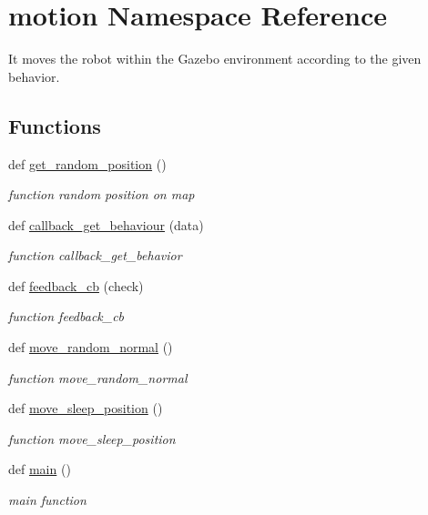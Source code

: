 \hypertarget{namespacemotion}{}\section{motion Namespace Reference}
\label{namespacemotion}


It moves the robot within the Gazebo environment according to the given behavior.  


\subsection*{Functions}
\begin{DoxyCompactItemize}
\item 
def \hyperlink{namespacemotion_af838e21dbf42903e9919b1b9263e306c}{get\+\_\+random\+\_\+position} ()
\begin{DoxyCompactList}\small\item\em function random position on map \end{DoxyCompactList}\item 
def \hyperlink{namespacemotion_a223e65905edcd5f4605198efb23d2ca3}{callback\+\_\+get\+\_\+behaviour} (data)
\begin{DoxyCompactList}\small\item\em function callback\+\_\+get\+\_\+behavior \end{DoxyCompactList}\item 
def \hyperlink{namespacemotion_a4d516c2d2b3bec18bb4c6faf73e38fc8}{feedback\+\_\+cb} (check)
\begin{DoxyCompactList}\small\item\em function feedback\+\_\+cb \end{DoxyCompactList}\item 
def \hyperlink{namespacemotion_ad19c84db008ed0163c8122d570d026e2}{move\+\_\+random\+\_\+normal} ()
\begin{DoxyCompactList}\small\item\em function move\+\_\+random\+\_\+normal \end{DoxyCompactList}\item 
def \hyperlink{namespacemotion_a7e28371ac015cdd23c39095626abce98}{move\+\_\+sleep\+\_\+position} ()
\begin{DoxyCompactList}\small\item\em function move\+\_\+sleep\+\_\+position \end{DoxyCompactList}\item 
def \hyperlink{namespacemotion_ad6289fca8572f5af95fd28f4c2dbc68d}{main} ()
\begin{DoxyCompactList}\small\item\em main function \end{DoxyCompactList}\end{DoxyCompactItemize}
